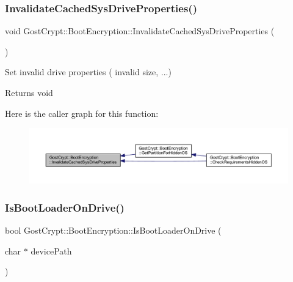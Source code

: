\subsubsection{\texorpdfstring{Invalidate\+Cached\+Sys\+Drive\+Properties()}{InvalidateCachedSysDriveProperties()}}
{\footnotesize\ttfamily void Gost\+Crypt\+::\+Boot\+Encryption\+::\+Invalidate\+Cached\+Sys\+Drive\+Properties (\begin{DoxyParamCaption}{ }\end{DoxyParamCaption})}



Set invalid drive properties ( invalid size, ...) 

\begin{DoxyReturn}{Returns}
void 
\end{DoxyReturn}
Here is the caller graph for this function\+:
\nopagebreak
\begin{figure}[H]
\begin{center}
\leavevmode
\includegraphics[width=350pt]{class_gost_crypt_1_1_boot_encryption_ae15a4ec32e1605b7dcd5979a4334601f_icgraph}
\end{center}
\end{figure}
\mbox{\label{class_gost_crypt_1_1_boot_encryption_a448f5e8fc2f4463a8147f702c2e2d217}} 
\subsubsection{\texorpdfstring{Is\+Boot\+Loader\+On\+Drive()}{IsBootLoaderOnDrive()}}
{\footnotesize\ttfamily bool Gost\+Crypt\+::\+Boot\+Encryption\+::\+Is\+Boot\+Loader\+On\+Drive (\begin{DoxyParamCaption}\item[{char $\ast$}]{device\+Path }\end{DoxyParamCaption})}



